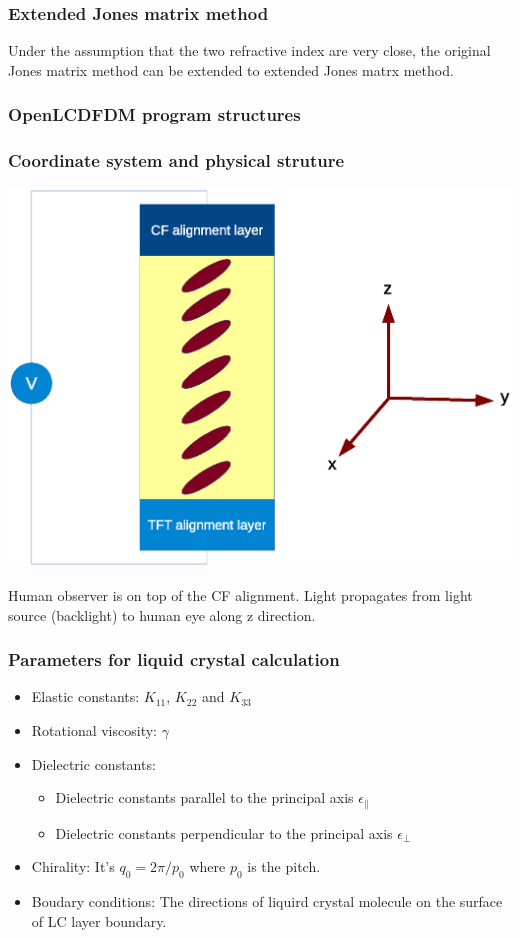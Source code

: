 \documentclass{beamer}
\begin{document}
\begin{frame}
\frametitle{Extended Jones matrix method}
Under the assumption that the two refractive index are very close, the original Jones matrix method can be extended to extended Jones matrx method.

\end{frame}
\begin{frame}
\frametitle{OpenLCDFDM program structures}
\end{frame}
\begin{frame}
\frametitle{Coordinate system and physical struture}
\begin{center}
\includegraphics[scale=0.38]{OneDimension_Coordinate.eps}
\end{center}
Human observer is on top of the CF alignment. Light propagates from light source (backlight) to human eye along z direction.
\end{frame}
\begin{frame}
\frametitle{Parameters for liquid crystal calculation}
\begin{itemize}
\item Elastic constants: $K_{11}$, $K_{22}$ and $K_{33}$
\item Rotational viscosity: $\gamma$
\item Dielectric constants:
	\begin{itemize}
	\item Dielectric constants parallel to the principal axis $\epsilon_{\parallel}$
	\item Dielectric constants perpendicular to the principal axis $\epsilon_{\perp}$
	\end{itemize}
\item Chirality: It's $q_0=2\pi/p_0$ where $p_0$ is the pitch.
\item Boudary conditions: The directions of liquird crystal molecule on the surface of LC layer boundary.
\end{itemize}
\end{frame}
\end{document}

